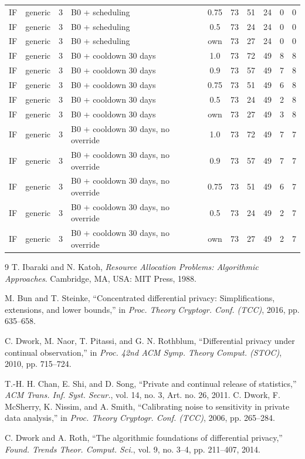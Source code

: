 \documentclass[10pt,onecolumn,letterpaper]{article}
\begin{document}
\begin{longtable}{lllp{4.4cm}cccccc}
IF & generic & 3 & B0 + scheduling & 0.75 & 73 & 51 & 24 & 0 & 0 \\
IF & generic & 3 & B0 + scheduling & 0.5 & 73 & 24 & 24 & 0 & 0 \\
IF & generic & 3 & B0 + scheduling & own & 73 & 27 & 24 & 0 & 0 \\
IF & generic & 3 & B0 + cooldown 30 days & 1.0 & 73 & 72 & 49 & 8 & 8 \\
IF & generic & 3 & B0 + cooldown 30 days & 0.9 & 73 & 57 & 49 & 7 & 8 \\
IF & generic & 3 & B0 + cooldown 30 days & 0.75 & 73 & 51 & 49 & 6 & 8 \\
IF & generic & 3 & B0 + cooldown 30 days & 0.5 & 73 & 24 & 49 & 2 & 8 \\
IF & generic & 3 & B0 + cooldown 30 days & own & 73 & 27 & 49 & 3 & 8 \\
IF & generic & 3 & B0 + cooldown 30 days, no override & 1.0 & 73 & 72 & 49 & 7 & 7 \\
IF & generic & 3 & B0 + cooldown 30 days, no override & 0.9 & 73 & 57 & 49 & 7 & 7 \\
IF & generic & 3 & B0 + cooldown 30 days, no override & 0.75 & 73 & 51 & 49 & 6 & 7 \\
IF & generic & 3 & B0 + cooldown 30 days, no override & 0.5 & 73 & 24 & 49 & 2 & 7 \\
IF & generic & 3 & B0 + cooldown 30 days, no override & own & 73 & 27 & 49 & 2 & 7 \\
\bottomrule
\end{longtable}

\clearpage
\begin{thebibliography}{9}
T. Ibaraki and N. Katoh, \textit{Resource Allocation Problems: Algorithmic Approaches}. Cambridge, MA, USA: MIT Press, 1988.

M. Bun and T. Steinke, ``Concentrated differential privacy: Simplifications, extensions, and lower bounds,'' in \textit{Proc. Theory Cryptogr. Conf. (TCC)}, 2016, pp. 635--658.

C. Dwork, M. Naor, T. Pitassi, and G. N. Rothblum, ``Differential privacy under continual observation,'' in \textit{Proc. 42nd ACM Symp. Theory Comput. (STOC)}, 2010, pp. 715--724.

T.-H. H. Chan, E. Shi, and D. Song, ``Private and continual release of statistics,'' \textit{ACM Trans. Inf. Syst. Secur.}, vol. 14, no. 3, Art. no. 26, 2011.
C. Dwork, F. McSherry, K. Nissim, and A. Smith, ``Calibrating noise to sensitivity in private data analysis,'' in \textit{Proc. Theory Cryptogr. Conf. (TCC)}, 2006, pp. 265--284.

C. Dwork and A. Roth, ``The algorithmic foundations of differential privacy,'' \textit{Found. Trends Theor. Comput. Sci.}, vol. 9, no. 3--4, pp. 211--407, 2014.

\end{thebibliography}
\end{document}

